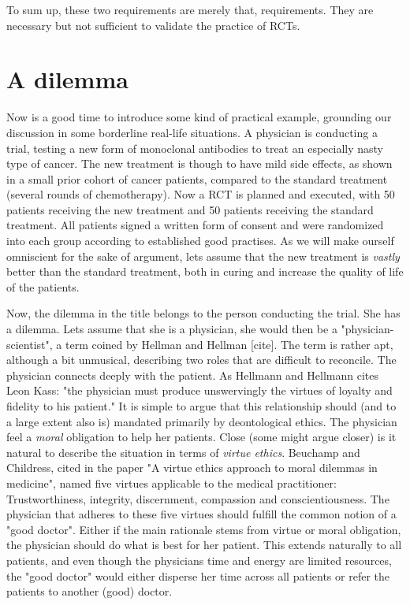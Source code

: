 \documentclass[12p]{article}
\begin{document}
To sum up, these two requirements are merely that, requirements.
They are necessary but not sufficient to validate the practice of RCTs.

\section*{A dilemma}

Now is a good time to introduce some kind of practical example, grounding our discussion in some borderline real-life situations.
A physician is conducting a trial, testing a new form of monoclonal antibodies to treat an especially nasty type of cancer.
The new treatment is though to have mild side effects, as shown in a small prior cohort of cancer patients, compared to the standard treatment (several rounds of chemotherapy).
Now a RCT is planned and executed, with 50 patients receiving the new treatment and 50 patients receiving the standard treatment.
All patients signed a written form of consent and were randomized into each group according to established good practises.
As we will make ourself omniscient for the sake of argument, lets assume that the new treatment is \emph{vastly} better than the standard treatment, both in curing and increase the quality of life of the patients.

Now, the dilemma in the title belongs to the person conducting the trial.
She has a dilemma.
Lets assume that she is a physician, she would then be a "physician-scientist", a term coined by Hellman and Hellman [cite].
The term is rather apt, although a bit unmusical, describing two roles that are difficult to reconcile.
The physician connects deeply with the patient.
As Hellmann and Hellmann cites Leon Kass: "the physician must produce unswervingly the virtues of loyalty and fidelity to his patient."
It is simple to argue that this relationship should (and to a large extent also is) mandated primarily by deontological ethics.
The physician feel a \emph{moral} obligation to help her patients.
Close (some might argue closer) is it natural to describe the situation in terms of \emph{virtue ethics}.
Beuchamp and Childress, cited in the paper "A virtue ethics approach to moral dilemmas in medicine", named five virtues applicable to the medical practitioner:
Trustworthiness, integrity, discernment, compassion and conscientiousness.
The physician that adheres to these five virtues should fulfill the common notion of a "good doctor".
Either if the main rationale stems from virtue or moral obligation, the physician should do what is best for her patient.
This extends naturally to all patients, and even though the physicians time and energy are limited resources, the "good doctor" would either disperse her time across all patients or refer the patients to another (good) doctor.
\end{document}
